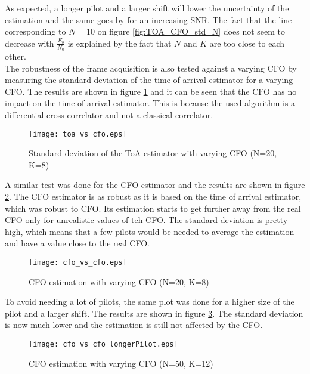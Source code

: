 As expected, a longer pilot and a larger shift will lower the uncertainty of the estimation and the same goes by for an increasing SNR. The fact that the line corresponding to $N = 10$ on figure \ref{fig:TOA_CFO_std_N} does not seem to decrease with $\frac{E_b}{N_0}$ is explained by the fact that $N$ and $K$ are too close to each other.\\
The robustness of the frame acquisition is also tested against a varying CFO by measuring the standard deviation of the time of arrival estimator for a varying CFO. The results are shown in figure \ref{fig:TOA_std_CFO} and it can be seen that the CFO has no impact on the time of arrival estimator. This is because the used algorithm is a differential cross-correlator and not a classical correlator. \\

\begin{figure}[H]
    \centering
    \texttt{[image: toa\_vs\_cfo.eps]}
    \caption{Standard deviation of the ToA estimator with varying CFO (N=20, K=8)}
    \label{fig:TOA_std_CFO}
\end{figure}

A similar test was done for the CFO estimator and the results are shown in figure \ref{fig:CFO_std_CFO}. The CFO estimator is as robust as it is based on the time of arrival estimator, which was robust to CFO. Its estimation starts to get further away from the real CFO only for unrealistic values of teh CFO. The standard deviation is pretty high, which means that a few pilots would be needed to average the estimation and have a value close to the real CFO. \\

\begin{figure}[H]
    \centering
    \texttt{[image: cfo\_vs\_cfo.eps]}
    \caption{CFO estimation with varying CFO (N=20, K=8)}
    \label{fig:CFO_std_CFO}
\end{figure}

To avoid needing a lot of pilots, the same plot was done for a higher size of the pilot and a larger shift. The results are shown in figure \ref{fig:CFO_std_CFO_N}. The standard deviation is now much lower and the estimation is still not affected by the CFO. \\

\begin{figure}[H]
    \centering
    \texttt{[image: cfo\_vs\_cfo\_longerPilot.eps]}
    \caption{CFO estimation with varying CFO (N=50, K=12)}
    \label{fig:CFO_std_CFO_N}
\end{figure}
